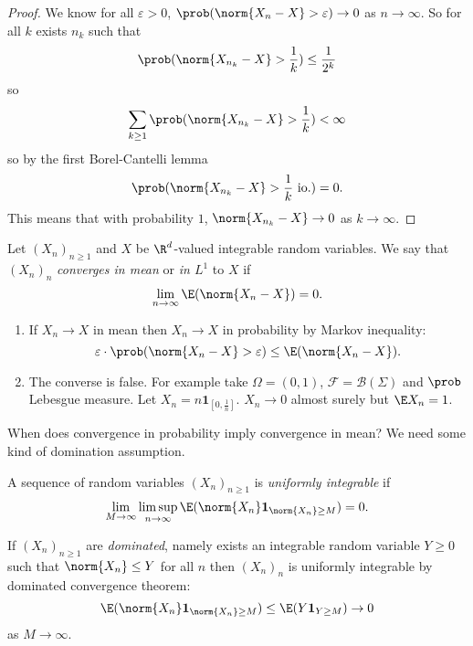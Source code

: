 \documentclass[a4paper]{article}
\renewcommand{\P}{\prob} %
\begin{document}
\begin{proof}
  We know for all \(\varepsilon > 0\), \(\P(\norm{X_n - X} > \varepsilon) \to 0\) as \(n \to \infty\). So for all \(k\) exists \(n_k\) such that
  \[
    \P(\norm{X_{n_k} - X} > \frac{1}{k}) \leq \frac{1}{2^k}
  \]
  so
  \[
    \sum_{k \geq 1} \P(\norm{X_{n_k} - X} > \frac{1}{k}) < \infty
  \]
  so by the first Borel-Cantelli lemma
  \[
    \P(\norm{X_{n_k} - X} > \frac{1}{k} \text{ io.}) = 0.
  \]
  This means that with probability \(1\), \(\norm{X_{n_k} - X} \to 0\) as \(k \to \infty\).
\end{proof}

\begin{definition}
  Let \((X_n)_{n \geq 1}\) and \(X\) be \(\R^d\)-valued integrable random variables. We say that \((X_n)_n\) \emph{converges in mean} or \emph{in \(L^1\)} to \(X\) if
  \[
    \lim_{n \to \infty} \E(\norm{X_n - X}) = 0.
  \]
\end{definition}

\begin{remark}\leavevmode
  \begin{enumerate}
  \item If \(X_n \to X\) in mean then \(X_n \to X\) in probability by Markov inequality:
    \[
      \varepsilon \cdot \P(\norm{X_n - X} > \varepsilon) \leq \E(\norm{X_n - X}).
    \]
  \item The converse is false. For example take \(\Omega = (0, 1)\), \(\mathcal F = \mathcal B(\Sigma)\) and \(\P\) Lebesgue measure. Let \(X_n = n \mathbf 1_{[0, \frac{1}{n}]}\). \(X_n \to 0\) almost surely but \(\E X_n = 1\).
  \end{enumerate}
\end{remark}

When does convergence in probability imply convergence in mean? We need some kind of domination assumption.

\begin{definition}
  A sequence of random variables \((X_n)_{n \geq 1}\) is \emph{uniformly integrable} if
  \[
    \lim_{M \to \infty} \limsup_{n \to \infty} \E(\norm{X_n} \mathbf 1_{\norm{X_n} \geq M}) = 0.
  \]
\end{definition}

\begin{remark}
  If \((X_n)_{n \geq 1}\) are \emph{dominated}, namely exists an integrable random variable \(Y \geq 0\) such that \(\norm{X_n} \leq Y\) for all \(n\) then \((X_n)_n\) is uniformly integrable by dominated convergence theorem:
  \[
    \E(\norm{X_n} \mathbf 1_{\norm{X_n} \geq M}) \leq \E(Y \mathbf 1_{Y \geq M}) \to 0
  \]
  as \(M \to \infty\).
\end{remark}
\end{document}
